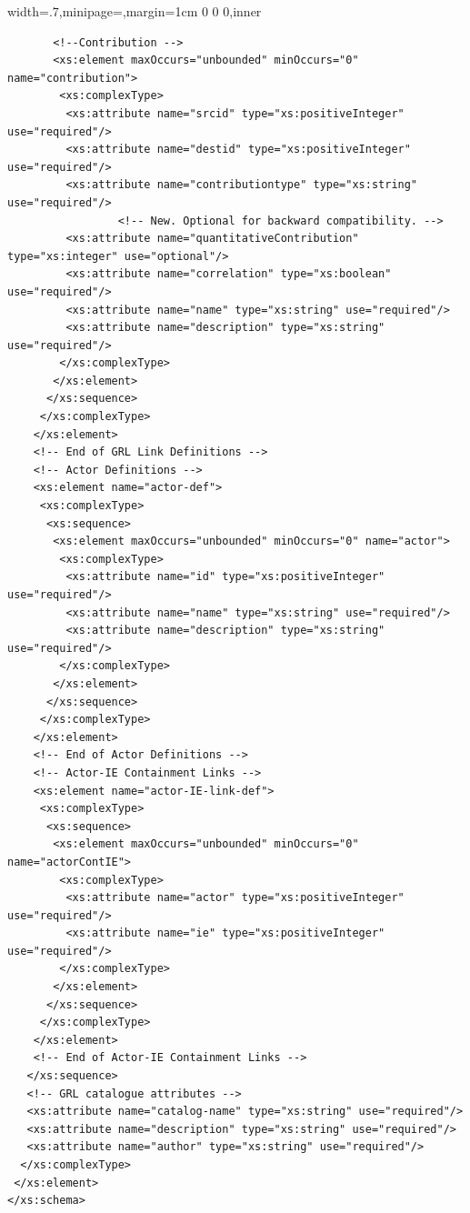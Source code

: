 \documentclass[dissertation,final]{softeng}
\newenvironment{featurecode}[1]
{ \lrbox\featurebox \begin{adjustbox}{width=#1\textwidth,minipage=\textwidth,margin=1cm 0 0 0,inner} }
{ \end{adjustbox}\endlrbox}
\newenvironment{featurelist}[2]
{
\newcommand{\setcaption}{\caption{#1}}
\newcommand{\setlabel}{\label{#2}}
}
{\begin{listing}[h!]\centering\usebox\featurebox\setcaption\setlabel\end{listing}}
\begin{document}
\begin{appendices}
\begin{featurelist}{GRL Catalogue XSD Schema -- Part two}{lst:grl_catalogue_xsd_schema_two}
\begin{featurecode}{.7}
\begin{verbatim}
	   <!--Contribution -->
	   <xs:element maxOccurs="unbounded" minOccurs="0" name="contribution">
		<xs:complexType>
		 <xs:attribute name="srcid" type="xs:positiveInteger" use="required"/>
		 <xs:attribute name="destid" type="xs:positiveInteger" use="required"/>
		 <xs:attribute name="contributiontype" type="xs:string" use="required"/>
                 <!-- New. Optional for backward compatibility. -->
		 <xs:attribute name="quantitativeContribution" type="xs:integer" use="optional"/>
		 <xs:attribute name="correlation" type="xs:boolean" use="required"/>
		 <xs:attribute name="name" type="xs:string" use="required"/>
		 <xs:attribute name="description" type="xs:string" use="required"/>
		</xs:complexType>
	   </xs:element>
	  </xs:sequence>
	 </xs:complexType>
	</xs:element>
	<!-- End of GRL Link Definitions -->
    <!-- Actor Definitions -->
	<xs:element name="actor-def">
	 <xs:complexType>
	  <xs:sequence>
	   <xs:element maxOccurs="unbounded" minOccurs="0" name="actor">
	    <xs:complexType>
		 <xs:attribute name="id" type="xs:positiveInteger" use="required"/>
		 <xs:attribute name="name" type="xs:string" use="required"/>
		 <xs:attribute name="description" type="xs:string" use="required"/>
		</xs:complexType>
	   </xs:element>
	  </xs:sequence>
     </xs:complexType>
    </xs:element>
    <!-- End of Actor Definitions -->
	<!-- Actor-IE Containment Links -->
	<xs:element name="actor-IE-link-def">
	 <xs:complexType>
	  <xs:sequence>
	   <xs:element maxOccurs="unbounded" minOccurs="0" name="actorContIE">
	    <xs:complexType>
		 <xs:attribute name="actor" type="xs:positiveInteger" use="required"/>
		 <xs:attribute name="ie" type="xs:positiveInteger" use="required"/>
		</xs:complexType>
	   </xs:element>
	  </xs:sequence>
     </xs:complexType>
    </xs:element>
    <!-- End of Actor-IE Containment Links -->
   </xs:sequence>
   <!-- GRL catalogue attributes -->
   <xs:attribute name="catalog-name" type="xs:string" use="required"/>
   <xs:attribute name="description" type="xs:string" use="required"/>
   <xs:attribute name="author" type="xs:string" use="required"/>
  </xs:complexType>
 </xs:element>
</xs:schema>
\end{verbatim}
\end{featurecode}
\end{featurelist}
\end{appendices}


\end{document}
